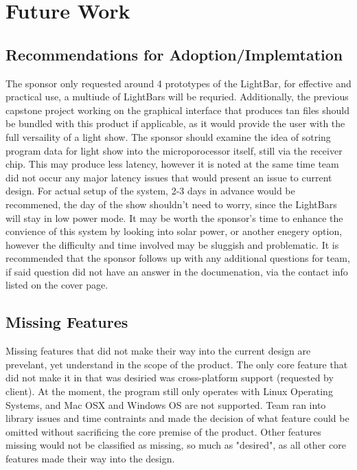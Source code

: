 \documentclass[12pt]{article}
\begin{document}
{{{{	\section{Future Work}
	
		\subsection{Recommendations for Adoption/Implemtation}
		The sponsor only requested around 4 prototypes of the LightBar, for effective and practical use, a multiude of LightBars will be requried. Additionally, the previous capstone project working on the graphical interface that produces tan files should be bundled with this product if applicable, as it would provide the user with the full versaility of a light show. The sponsor should examine the idea of sotring program data for light show into the microporocessor itself, still via the receiver chip. This may produce less latency, however it is noted at the same time team did not occur any major latency issues that would present an issue to current design. For actual setup of the system, 2-3 days in advance would be recommened, the day of the show shouldn't need to worry, since the LightBars will stay in low power mode. It may be worth the sponsor's time to enhance the convience of this system by looking into solar power, or another enegery option, however the difficulty and time involved may be sluggish and problematic. It is recommended that the sponsor follows up with any additional questions for team, if said question did not have an answer in the documenation, via the contact info listed on the cover page.
		
		\subsection{Missing Features}
		Missing features that did not make their way into the current design are prevelant, yet understand in the scope of the product. The only core feature that did not make it in that was desiried was cross-platform support (requested by client). At the moment, the program still only operates with Linux Operating Systems, and Mac OSX and Windows OS are not supported. Team ran into library issues and time contraints and made the decision of what feature could be omitted without sacrificing the core premise of the product. Other features missing would not be classified as missing, so much as "desired", as all other core features made their way into the design. 
		
}}}}
\end{document}
